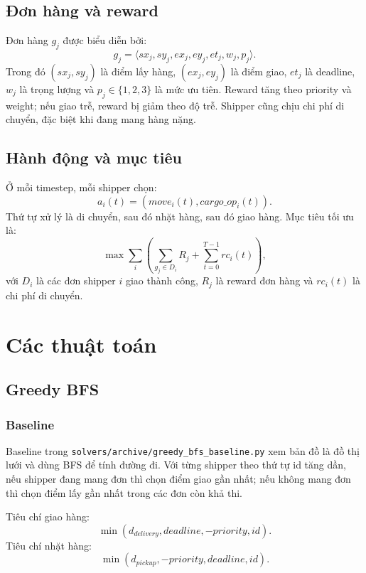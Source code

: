 \documentclass[conference]{IEEEtran}
\newcommand{\code}[1]{\texttt{#1}}
\begin{document}
\subsection{Đơn hàng và reward}
Đơn hàng $g_j$ được biểu diễn bởi:
\begin{equation}
g_j = \langle sx_j, sy_j, ex_j, ey_j, et_j, w_j, p_j \rangle.
\end{equation}
Trong đó $(sx_j, sy_j)$ là điểm lấy hàng, $(ex_j, ey_j)$ là điểm giao, $et_j$ là deadline, $w_j$ là trọng lượng và $p_j \in \{1,2,3\}$ là mức ưu tiên. Reward tăng theo priority và weight; nếu giao trễ, reward bị giảm theo độ trễ. Shipper cũng chịu chi phí di chuyển, đặc biệt khi đang mang hàng nặng.

\subsection{Hành động và mục tiêu}
Ở mỗi timestep, mỗi shipper chọn:
\begin{equation}
a_i(t)=(move_i(t), cargo\_op_i(t)).
\end{equation}
Thứ tự xử lý là di chuyển, sau đó nhặt hàng, sau đó giao hàng. Mục tiêu tối ưu là:
\begin{equation}
\max \sum_i \left(\sum_{g_j \in D_i} R_j + \sum_{t=0}^{T-1} rc_i(t)\right),
\end{equation}
với $D_i$ là các đơn shipper $i$ giao thành công, $R_j$ là reward đơn hàng và $rc_i(t)$ là chi phí di chuyển.

\section{Các thuật toán}
\subsection{Greedy BFS}
\subsubsection{Baseline}
Baseline trong \code{solvers/archive/greedy\_bfs\_baseline.py} xem bản đồ là đồ thị lưới và dùng BFS để tính đường đi. Với từng shipper theo thứ tự id tăng dần, nếu shipper đang mang đơn thì chọn điểm giao gần nhất; nếu không mang đơn thì chọn điểm lấy gần nhất trong các đơn còn khả thi.

Tiêu chí giao hàng:
\begin{equation}
\min(d_{delivery}, deadline, -priority, id).
\end{equation}
Tiêu chí nhặt hàng:
\begin{equation}
\min(d_{pickup}, -priority, deadline, id).
\end{equation}
\end{document}
